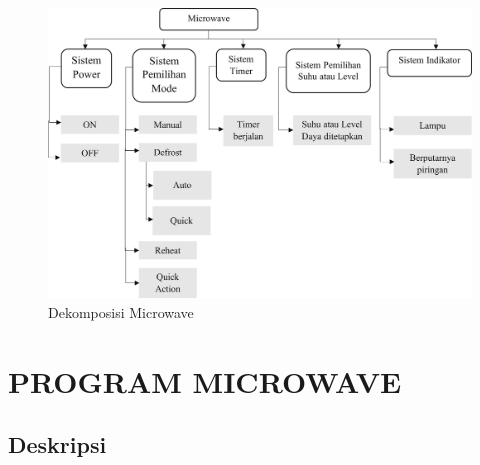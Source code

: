 \documentclass[conference]{IEEEtran}
\begin{document}
\begin{figure}[htbp]
    \centering
    \def\svgwidth{\columnwidth}
    \centerline{\includegraphics[scale=0.45]{dekomposisi.png}}
    \caption{Dekomposisi Microwave}
    \label{fig1}
\end{figure}

\section{PROGRAM MICROWAVE}

\subsection{Deskripsi}
\end{document}
